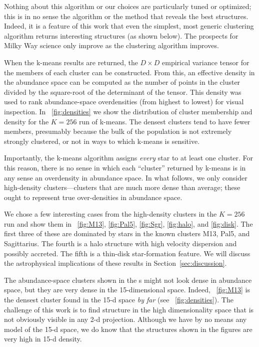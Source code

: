 \documentclass[12pt, letterpaper, preprint]{aastex}
\newcommand{\sectionname}{Section}
\begin{document}
Nothing about this algorithm or our choices are particularly
tuned or optimized; this is in no sense the
algorithm or the method that reveals the best structures.
Indeed, it is a feature of this work that even the simplest, most
generic clustering algorithm returns interesting
structures (as shown below).
The prospects for Milky Way science only improve as the clustering
algorithm improves.

When the k-means results are returned, the $D\times D$ empirical
variance tensor for the members of each cluster can be constructed.
From this, an effective density in the abundance space can be computed
as the number of points in the cluster divided by the square-root of
the determinant of the tensor.
This density was used to rank abundance-space overdensities (from highest
to lowest) for visual inspection.
In \figurename~\ref{fig:densities} we show the distribution of cluster membership
and density for the $K=256$ run of k-means.
The densest clusters tend to have fewer members, presumably because
the bulk of the population is not extremely strongly clustered, or not
in ways to which k-means is sensitive.

Importantly, the k-means algorithm assigns \emph{every} star to at
least one cluster.
For this reason, there is no sense in which each ``cluster'' returned
by k-means is in any sense an overdensity in abundance space.
In what follows, we only consider high-density clusters---clusters
that are much more dense than average; these ought to represent true
over-densities in abundance space.

We chose a few interesting cases from the high-density clusters
in the $K=256$ run and show them in
\figurename~\ref{fig:M13}, \ref{fig:Pal5}, \ref{fig:Sgr},
\ref{fig:halo}, and \ref{fig:disk}.
The first three of these are dominated by stars in the known clusters
M13, Pal5, and Sagittarius.
The fourth is a halo structure with high velocity dispersion and
possibly accreted.
The fifth is a thin-disk star-formation feature.
We will discuss the astrophysical implications of these results in
\sectionname~\ref{sec:discussion}.

The abundance-space clusters shown in the \figurename s
might not look dense in abundance space, but they
are very dense in the 15-dimensional space.  Indeed,
\figurename~\ref{fig:M13} is the densest cluster found in the 15-d
space \emph{by far} (see \figurename~\ref{fig:densities}).
The challenge of this work is to find structure in the high
dimensionality space that is not obviously visible in any 2-d projection.
Although we have by no means any model of the 15-d space, we do know
that the structures shown in the figures are very high in 15-d
density.
\end{document}
